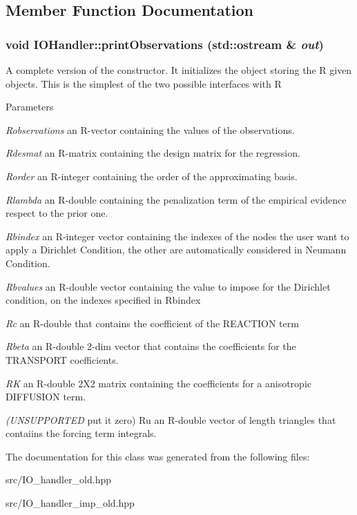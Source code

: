 \subsection{Member Function Documentation}
\hypertarget{classIOHandler_ae1902fae16f3d44a15b76e175d2a7299}{
\subsubsection[{printObservations}]{\setlength{\rightskip}{0pt plus 5cm}void IOHandler::printObservations (std::ostream \& {\em out})}}
\label{classIOHandler_ae1902fae16f3d44a15b76e175d2a7299}


A complete version of the constructor. It initializes the object storing the R given objects. This is the simplest of the two possible interfaces with R 
\begin{DoxyParams}{Parameters}
\item[{\em Robservations}]an R-\/vector containing the values of the observations. \item[{\em Rdesmat}]an R-\/matrix containing the design matrix for the regression. \item[{\em Rorder}]an R-\/integer containing the order of the approximating basis. \item[{\em Rlambda}]an R-\/double containing the penalization term of the empirical evidence respect to the prior one. \item[{\em Rbindex}]an R-\/integer vector containing the indexes of the nodes the user want to apply a Dirichlet Condition, the other are automatically considered in Neumann Condition. \item[{\em Rbvalues}]an R-\/double vector containing the value to impose for the Dirichlet condition, on the indexes specified in Rbindex \item[{\em Rc}]an R-\/double that contains the coefficient of the REACTION term \item[{\em Rbeta}]an R-\/double 2-\/dim vector that contains the coefficients for the TRANSPORT coefficients. \item[{\em RK}]an R-\/double 2X2 matrix containing the coefficients for a anisotropic DIFFUSION term. \item[{\em (UNSUPPORTED}]put it zero) Ru an R-\/double vector of length triangles that contaiins the forcing term integrals. \end{DoxyParams}


The documentation for this class was generated from the following files:\begin{DoxyCompactItemize}
\item 
src/IO\_\-handler\_\-old.hpp\item 
src/IO\_\-handler\_\-imp\_\-old.hpp\end{DoxyCompactItemize}
